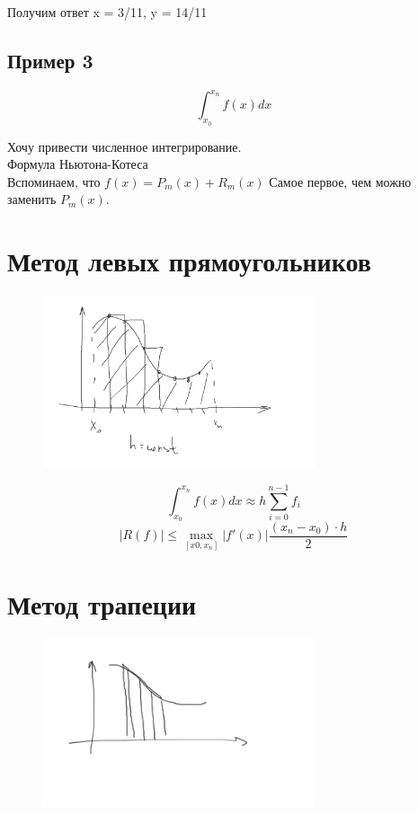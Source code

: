 \documentclass[a4paper,12pt]{article}
\newcommand\attention[1]{\colorbox{cyan!30}{#1}}
\begin{document}
    Получим ответ x = 3/11, y = 14/11

\subsection*{Пример 3}

$$\int_{x_0}^{x_n} f(x) dx$$

Хочу привести численное интегрирование. \\

\attention{Формула Ньютона-Котеса}\\
Вспоминаем, что $f(x) = P_m(x) + R_m(x)$
Самое первое, чем можно заменить $P_m(x)$.

\section*{ Метод левых прямоугольников}

        \begin{figure}[h!]
            \centering
            \includegraphics[width=8cm]{10SemPic1.png}
            \label{fig:vac}
        \end{figure}

$$\int_{x_0}^{x_n} f(x) dx \approx h \sum_{i = 0}^{n-1}f_i$$
$$|R(f)| \leq \max_{[x0, x_n]} |f'(x)| \frac{(x_n - x_0) \cdot h}{2}$$

\section* {Метод трапеции}

        \begin{figure}[h!]
            \centering
            \includegraphics[width=8cm]{10SemPic2.png}
            \label{fig:vac}
        \end{figure}
\end{document}
